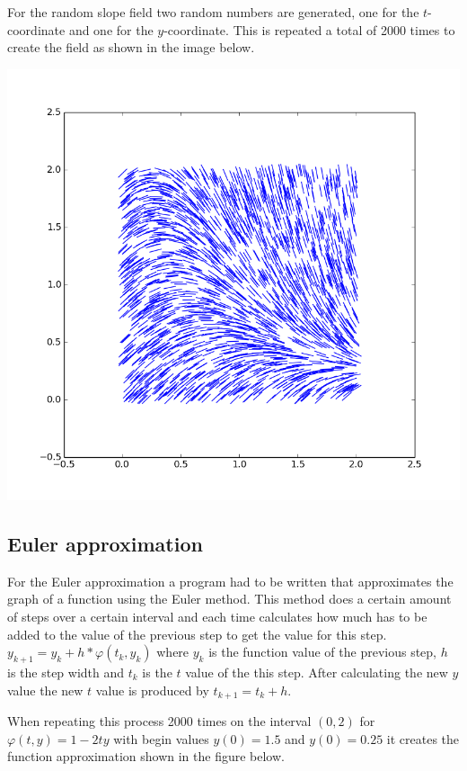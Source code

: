 \documentclass[a4paper,12px]{article}
\begin{document}
For the random slope field two random numbers are generated, one for the
$t$-coordinate and one for the $y$-coordinate. This is repeated a total of 2000
times to create the field as shown in the image below.
\begin{center}
    \includegraphics[width=\textwidth]{randomfield}
\end{center}

\subsection{Euler approximation}

For the Euler approximation a program had to be written that approximates the
graph of a function using the Euler method. This method does a certain amount of
steps over a certain interval and each time calculates how much has to be added
to the value of the previous step to get the value for this step.
$y_{k+1}=y_k+h*\varphi (t_k,y_k)$ where $y_k$ is the function value of the
previous step, $h$ is the step width and $t_k$ is the $t$ value of the  this
step. After calculating the new $y$ value the new $t$ value is produced by
$t_{k+1} = t_k + h$.

When repeating this process 2000 times on the interval $(0,2)$ for $\varphi(t,
y) = 1-2ty$ with begin values $y(0) = 1.5$ and $y(0) = 0.25$ it creates the
function approximation shown in the figure below.
\end{document}

